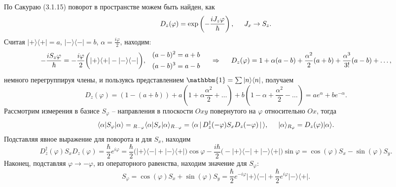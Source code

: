 По Сакураю (3.1.15) поворот в пространстве можем быть найден, как
\begin{equation*}
    D_z (\varphi) = \exp\left(- \frac{i J_z \varphi}{\hbar}\right), \hspace{5 mm} J_x \to S_z.
\end{equation*}
Считая $| + \rangle \langle + | = a$, $| - \rangle \langle - | = b$, $\alpha = \frac{i \varphi}{2}$, находим:
\begin{equation*}
    -\frac{i S_z \varphi}{\hbar} = - \frac{i \varphi}{2} \bigg(
        | + \rangle \langle + | - | - \rangle \langle - | 
    \bigg), \hspace{2.5 mm} 
    \left.\begin{aligned}
        (a-b)^2 &= a + b \\
        (a-b)^3 &= a - b
    \end{aligned}\right.
    \hspace{0.5cm} \Rightarrow \hspace{0.5cm}
    D_z (\varphi) = 1 + \alpha (a-b) + \frac{\alpha^2}{2} (a+b) + \frac{\alpha^3}{3!}(a-b) + \ldots,
\end{equation*}
немного перегруппируя члены, и пользуясь представлением $\mathbbm{1} = \sum | n \rangle \langle n |$, получаем
\begin{equation*}
    D_z(\varphi) = (1 - (a + b)) + a \left(1 + \alpha \textstyle\frac{\alpha^2}{2}+\ldots\right) + b \left(
        1 - \alpha + \textstyle \frac{\alpha^2}{2} - \ldots
    \right) = a e^\alpha + b e^{-\alpha}.
\end{equation*}
Рассмотрим измерения в базисе $S_\varphi$ -- направления в плоскости $Oxy$ повернутого на $\varphi$ относительно $Ox$, тогда 
\begin{equation*}
    \langle \alpha| S_\varphi | \alpha\rangle = \vphantom{1}_{R_{-\varphi}}
    \langle \alpha| S_x | \alpha\rangle_{R_{-\varphi}} = 
    \langle \alpha \,|\, D^\dag_z (-\varphi) S_x D_z (-\varphi) \,|\, \rangle,
    \hspace{5 mm}   
    | \alpha\rangle_{R_\varphi} = D_z (\varphi) | \alpha\rangle.
\end{equation*}
Подставляя явное выражение для поворота  и для $S_x$, находим
\begin{equation*}
    D^\dag_z (\varphi) S_x D_z (\varphi) = 
    \frac{\hbar}{2} e^{i \varphi} = 
    \frac{\hbar}{2} \bigg(
        | + \rangle \langle - |  + | - \rangle \langle + | 
    \bigg) \cos \varphi 
    - \frac{i \hbar}{2} \bigg(
        -| + \rangle \langle - |  + | - \rangle \langle + | 
    \bigg) \sin \varphi = \cos (\varphi) S_x - \sin(\varphi) S_y.
\end{equation*}
Наконец, подставляя $\varphi \to - \varphi$, из операторного равенства, находим значение для $S_\varphi$:
\begin{equation*}
    S_\varphi = \cos(\varphi) S_x + \sin(\varphi) S_y = 
    \frac{\hbar}{2}e^{-i \varphi} | + \rangle \langle - |  + \frac{\hbar}{2}e^{i\varphi} | - \rangle \langle + |.
\end{equation*}


